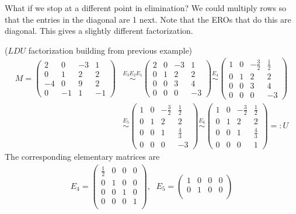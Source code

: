 \newpage
What if we stop at a different point in elimination? 
We could multiply rows so that the entries in the diagonal are 1 next. Note that the EROs that do this are diagonal. This gives a slightly different factorization.
\begin{example} \label{factorizes}($LDU$ factorization building from previous example)
\begin{align*}
M=
\begin{pmatrix}
2&0&-3&1\\
0&1&2&2\\
-4&0&9&2\\
0&-1&1&-1
\end{pmatrix}
&\stackrel{E_3E_2E_1}{\sim}
\begin{pmatrix}
2&0&-3&1\\
0&1&2&2\\
0&0&3&4\\
0&0&0&-3
\end{pmatrix}
\stackrel{E_4}{\sim}
\begin{pmatrix}
1&0&-\frac{3}{2}&\frac{1}{2}\\
0&1&2&2\\
0&0&3&4\\
0&0&0&-3
\end{pmatrix}
\\[2mm]
&\stackrel{E_5}{\sim}
\begin{pmatrix}
1&0&-\frac{3}{2}&\frac{1}{2}\\
0&1&2&2\\
0&0&1&\frac43\\
0&0&0&-3
\end{pmatrix}
\stackrel{E_6}{\sim}
\begin{pmatrix}
1&0&-\frac{3}{2}&\frac{1}{2}\\
0&1&2&2\\
0&0&1&\frac43\\
0&0&0&1
\end{pmatrix}
=:U
\end{align*}
The corresponding elementary matrices are
\begin{align*}
E_4=
\begin{pmatrix}
\frac12&0&0&0\\
0&1&0&0\\
0&0&1&0\\
0&0&0&1\\
\end{pmatrix} , \, ~~
E_5=
\begin{pmatrix}
1&0&0&0\\
0&1&0&0\\

\end{pmatrix}
\end{align*}
\end{example}
